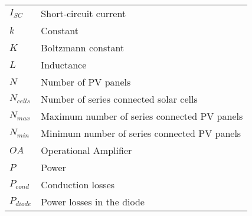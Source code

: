 \begin{tabular}{ll}
$I_{SC}$ & Short-circuit current\\
$k$ & Constant \\
$K$ & Boltzmann constant \\
$L$ & Inductance\\
$N$ & Number of PV panels \\
$N_{cells}$ & Number of series connected solar cells \\ 
$N_{max}$ & Maximum number of series connected PV panels \\
$N_{min}$ & Minimum number of series connected PV panels \\
$OA$ & Operational Amplifier \\
$P$ & Power\\
$P_{cond}$ & Conduction losses \\
$P_{diode}$ & Power losses in the diode \\
\end{tabular}
\newpage

